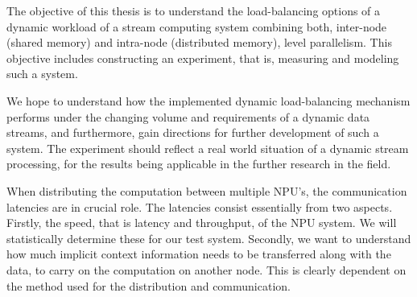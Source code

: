The objective of this thesis is to understand the load-balancing options of a dynamic workload of a stream computing system combining both, inter-node (shared memory) and intra-node (distributed memory), level parallelism. This objective includes constructing an experiment, that is, measuring and modeling  such a system.

We hope to understand how the implemented dynamic load-balancing mechanism performs under the changing volume and requirements of a dynamic data streams, and furthermore, gain directions for further development of such a system. The experiment should reflect a real world situation of a dynamic stream processing, for the results being applicable in the further research in the field.

When distributing the computation between multiple NPU's, the communication latencies are in crucial role. The latencies consist essentially from two aspects. Firstly, the speed, that is latency and throughput, of the NPU system. We will statistically determine these for our test system. Secondly, we want to understand how much implicit context information needs to be transferred along with the data, to carry on the computation on another node. This is clearly dependent on the method used for the distribution and communication.

